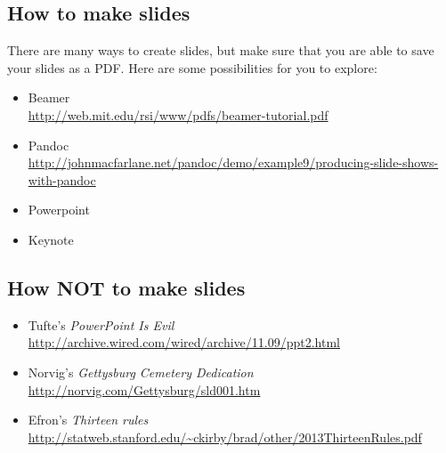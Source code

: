 \documentclass[11pt, oneside]{article}   	%
\begin{document}
\subsection*{How to make slides}

There are many ways to create slides, but make sure that you are able to
save your slides as a PDF.  Here are some possibilities for you to explore:
\begin{itemize}
\item Beamer\\
 \url{http://web.mit.edu/rsi/www/pdfs/beamer-tutorial.pdf}
\item Pandoc\\
 \url{http://johnmacfarlane.net/pandoc/demo/example9/producing-slide-shows-with-pandoc}
\item Powerpoint
\item Keynote
\end{itemize}

\subsection*{How \textbf{NOT} to make slides}

\begin{itemize}
\item Tufte's \emph{PowerPoint Is Evil}\\
 \url{http://archive.wired.com/wired/archive/11.09/ppt2.html}
\item Norvig's \emph{Gettysburg Cemetery Dedication}\\
 \url{http://norvig.com/Gettysburg/sld001.htm}
\item Efron's \emph{Thirteen rules}\\
 \url{http://statweb.stanford.edu/~ckirby/brad/other/2013ThirteenRules.pdf}
\end{itemize}
\end{document}
